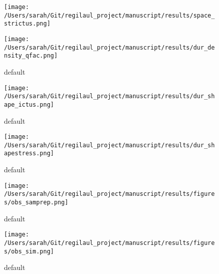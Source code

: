 \begin{figure}[htb]
\begin{center}
\texttt{[image: /Users/sarah/Git/regilaul\_project/manuscript/results/space\_strictus.png]}
\caption{}
\label{}
\end{center}
\end{figure}

\begin{figure}[htbp]
\begin{center}
\texttt{[image: /Users/sarah/Git/regilaul\_project/manuscript/results/dur\_density\_qfac.png]}
\caption{default}
\label{default}
\end{center}
\end{figure}


\begin{figure}[htbp]
\begin{center}
\texttt{[image: /Users/sarah/Git/regilaul\_project/manuscript/results/dur\_shape\_ictus.png]}
\caption{default}
\label{default}
\end{center}
\end{figure}

\begin{figure}[htbp]
\begin{center}
\texttt{[image: /Users/sarah/Git/regilaul\_project/manuscript/results/dur\_shapestress.png]}
\caption{default}
\label{default}
\end{center}
\end{figure}



\begin{figure}[htbp]
\begin{center}
\texttt{[image: /Users/sarah/Git/regilaul\_project/manuscript/results/figures/obs\_samprep.png]}
\caption{default}
\label{default}
\end{center}
\end{figure}

\begin{figure}[htbp]
\begin{center}
\texttt{[image: /Users/sarah/Git/regilaul\_project/manuscript/results/figures/obs\_sim.png]}
\caption{default}
\label{default}
\end{center}
\end{figure}




